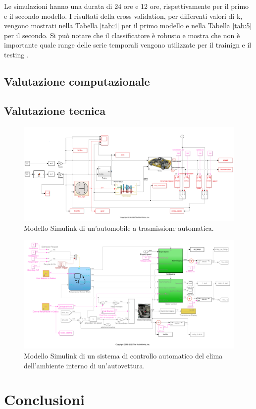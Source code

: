 \documentclass[Lau,binding=0.6cm]{sapthesis}
\begin{document}
Le simulazioni hanno una durata di 24 ore e 12 ore, rispettivamente per il primo e il secondo modello.
I risultati della cross validation, per differenti valori di k, vengono mostrati nella Tabella \ref{tab:4} per il primo modello e nella Tabella \ref{tab:5} per il secondo.
Si pu\`o notare che il classificatore \`e robusto e mostra che non \`e importante quale range delle serie temporali vengono utilizzate per il trainign e il testing .
\section{Valutazione computazionale} %


\section{Valutazione tecnica}

\begin{figure}
    \includegraphics[scale=0.38]{car.png}
    \centering
    \caption{Modello Simulink di un'automobile a trasmissione automatica.}
    \label{fig:1}
\end{figure}

\begin{figure}
    \includegraphics[scale=0.45]{climate.png}
    \centering
    \caption{Modello Simulink di un sistema di controllo automatico del clima dell'ambiente interno di un'autovettura.}
    \label{fig:2}
\end{figure}

\chapter{Conclusioni}

\backmatter
\end{document}
